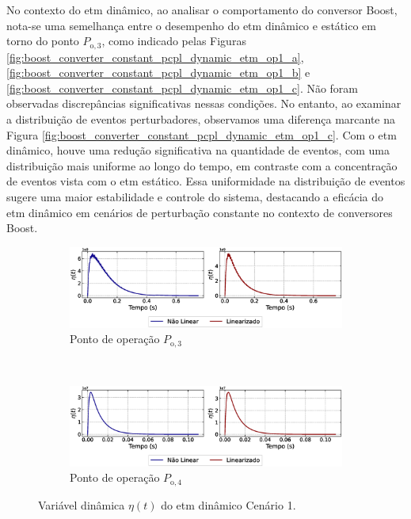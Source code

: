 No contexto do \acrshort{etm} dinâmico, ao analisar o comportamento do conversor Boost, nota-se uma semelhança entre o desempenho do \acrshort{etm} dinâmico e estático em torno do ponto $P_{\mathrm{o}, 3}$, como indicado pelas Figuras \ref{fig:boost_converter_constant_pcpl_dynamic_etm_op1_a}, \ref{fig:boost_converter_constant_pcpl_dynamic_etm_op1_b} e \ref{fig:boost_converter_constant_pcpl_dynamic_etm_op1_c}. Não foram observadas discrepâncias significativas nessas condições. No entanto, ao examinar a distribuição de eventos perturbadores, observamos uma diferença marcante na Figura \ref{fig:boost_converter_constant_pcpl_dynamic_etm_op1_c}. Com o \acrshort{etm} dinâmico, houve uma redução significativa na quantidade de eventos, com uma distribuição mais uniforme ao longo do tempo, em contraste com a concentração de eventos vista com o \acrshort{etm} estático. Essa uniformidade na distribuição de eventos sugere uma maior estabilidade e controle do sistema, destacando a eficácia do \acrshort{etm} dinâmico em cenários de perturbação constante no contexto de conversores Boost.

\begin{figure}[H]
  \centering
  \captionsetup{justification=centering}
  \begin{subfigure}{1.\textwidth}
    \centering
    \includegraphics[width=1.\textwidth]{figuras/dynamic-etm/boost/sim1/op1/eta.eps}
    \caption{Ponto de operação $P_{\mathrm{o}, 3}$}
  \end{subfigure}
  \\[6pt]
  \begin{subfigure}{1.\textwidth}
    \centering
    \includegraphics[width=1.\textwidth]{figuras/dynamic-etm/boost/sim1/op2/eta.eps}
    \caption{Ponto de operação $P_{\mathrm{o}, 4}$}
  \end{subfigure}
  \caption{Variável dinâmica $\eta(t)$ do \acrshort{etm} dinâmico Cenário 1.}
  \label{fig:boost_converter_constant_pcpl_dynamic_etm_eta}
\end{figure}


